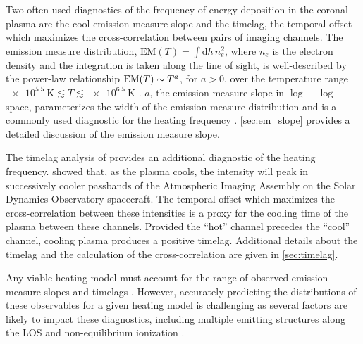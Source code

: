 Two often-used diagnostics of the frequency of energy deposition in the coronal plasma are the cool emission measure slope and the timelag, the temporal offset which maximizes the cross-correlation between pairs of imaging channels. The emission measure distribution, $\mathrm{EM}(T)=\int\mathrm{d}h\,n_e^2$, where $n_e$ is the electron density and the integration is taken along the line of sight, is well-described by the power-law relationship $\textup{EM}(T)\sim T^a$, for $a>0$, over the temperature range $\SI{e5.5}{\kelvin}\lesssim T\lesssim\SI{e6.5}{\kelvin}$ \citep{jordan_structure_1975,jordan_structure_1976}. $a$, the emission measure slope in $\log-\log$ space, parameterizes the width of the emission measure distribution and is a commonly used diagnostic for the heating frequency \citep[e.g.][]{tripathi_emission_2011,winebarger_using_2011,warren_constraints_2011,mulu-moore_can_2011,bradshaw_diagnosing_2012,schmelz_cold_2012,reep_diagnosing_2013,del_zanna_evolution_2015}. \autoref{sec:em_slope} provides a detailed discussion of the emission measure slope.

The timelag analysis of \citet{viall_evidence_2012} provides an additional diagnostic of the heating frequency. \citet{viall_patterns_2011} showed that, as the plasma cools, the intensity will peak in successively cooler passbands of the Atmospheric Imaging Assembly \citep[AIA,][]{lemen_atmospheric_2012} on the Solar Dynamics Observatory \citep[SDO,][]{pesnell_solar_2012} spacecraft. The temporal offset which maximizes the cross-correlation between these intensities is a proxy for the cooling time of the plasma between these channels. Provided the ``hot'' channel precedes the ``cool'' channel, cooling plasma produces a positive timelag. Additional details about the timelag and the calculation of the cross-correlation are given in \autoref{sec:timelag}. 

Any viable heating model must account for the range of observed emission measure slopes and timelags \citep{viall_survey_2017}. However, accurately predicting the distributions of these observables for a given heating model is challenging as several factors are likely to impact these diagnostics, including multiple emitting structures along the LOS and non-equilibrium ionization \citep[e.g.][]{barnes_inference_2016}.

